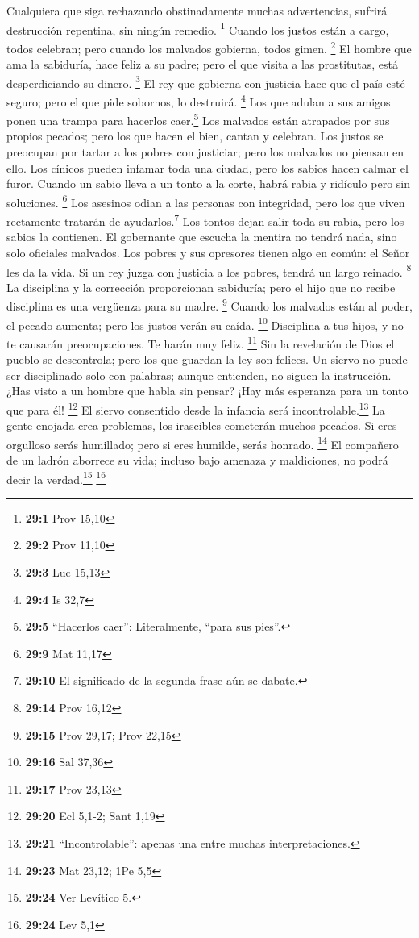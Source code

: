  Cualquiera que siga rechazando obstinadamente muchas
advertencias, sufrirá destrucción repentina, sin ningún remedio.
\footnote{\textbf{29:1} Prov 15,10}  Cuando los justos
están a cargo, todos celebran; pero cuando los malvados gobierna, todos
gimen. \footnote{\textbf{29:2} Prov 11,10}  El hombre que
ama la sabiduría, hace feliz a su padre; pero el que visita a las
prostitutas, está desperdiciando su dinero. \footnote{\textbf{29:3} Luc
  15,13}  El rey que gobierna con justicia hace que el
país esté seguro; pero el que pide sobornos, lo destruirá. \footnote{\textbf{29:4}
  Is 32,7}  Los que adulan a sus amigos ponen una trampa
para hacerlos caer.\footnote{\textbf{29:5} ``Hacerlos caer'':
  Literalmente, ``para sus pies''.}  Los malvados están
atrapados por sus propios pecados; pero los que hacen el bien, cantan y
celebran.  Los justos se preocupan por tartar a los pobres
con justiciar; pero los malvados no piensan en ello.  Los
cínicos pueden infamar toda una ciudad, pero los sabios hacen calmar el
furor.  Cuando un sabio lleva a un tonto a la corte, habrá
rabia y ridículo pero sin soluciones. \footnote{\textbf{29:9} Mat 11,17}
 Los asesinos odian a las personas con integridad, pero
los que viven rectamente tratarán de ayudarlos.\footnote{\textbf{29:10}
  El significado de la segunda frase aún se dabate.}  Los
tontos dejan salir toda su rabia, pero los sabios la contienen.
 El gobernante que escucha la mentira no tendrá nada,
sino solo oficiales malvados.  Los pobres y sus opresores
tienen algo en común: el Señor les da la vida.  Si un rey
juzga con justicia a los pobres, tendrá un largo reinado. \footnote{\textbf{29:14}
  Prov 16,12}  La disciplina y la corrección proporcionan
sabiduría; pero el hijo que no recibe disciplina es una vergüenza para
su madre. \footnote{\textbf{29:15} Prov 29,17; Prov 22,15}
 Cuando los malvados están al poder, el pecado aumenta;
pero los justos verán su caída. \footnote{\textbf{29:16} Sal 37,36}
 Disciplina a tus hijos, y no te causarán preocupaciones.
Te harán muy feliz. \footnote{\textbf{29:17} Prov 23,13} 
Sin la revelación de Dios el pueblo se descontrola; pero los que guardan
la ley son felices.  Un siervo no puede ser disciplinado
solo con palabras; aunque entienden, no siguen la instrucción.
 ¿Has visto a un hombre que habla sin pensar? ¡Hay más
esperanza para un tonto que para él! \footnote{\textbf{29:20} Ecl 5,1-2;
  Sant 1,19}  El siervo consentido desde la infancia será
incontrolable.\footnote{\textbf{29:21} ``Incontrolable'': apenas una
  entre muchas interpretaciones.}  La gente enojada crea
problemas, los irascibles cometerán muchos pecados.  Si
eres orgulloso serás humillado; pero si eres humilde, serás honrado.
\footnote{\textbf{29:23} Mat 23,12; 1Pe 5,5}  El
compañero de un ladrón aborrece su vida; incluso bajo amenaza y
maldiciones, no podrá decir la verdad.\footnote{\textbf{29:24} Ver
  Levítico 5.} \footnote{\textbf{29:24} Lev 5,1}

